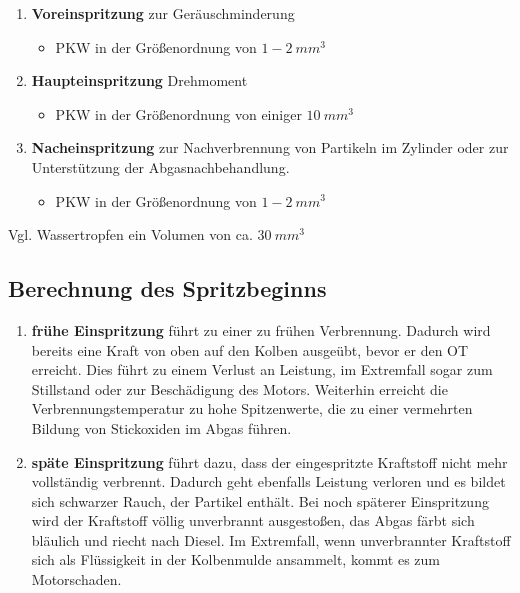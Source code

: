 \begin{enumerate}
\item
  \textbf{Voreinspritzung} zur Geräuschminderung

  \begin{itemize}
  \item
    PKW in der Größenordnung von $1 - 2~mm^3$
  \end{itemize}
\item
  \textbf{Haupteinspritzung} Drehmoment

  \begin{itemize}
  \item
    PKW in der Größenordnung von einiger $10~mm^3$
  \end{itemize}
\item
  \textbf{Nacheinspritzung} zur Nachverbrennung von Partikeln im
  Zylinder oder zur Unterstützung der Abgasnachbehandlung.

  \begin{itemize}
  \item
    PKW in der Größenordnung von $1 - 2~mm^3$
  \end{itemize}
\end{enumerate}

Vgl. Wassertropfen ein Volumen von ca. $30~mm^3$

\newpage

\subsection{Berechnung des
Spritzbeginns}\label{berechnung-des-spritzbeginns}

\begin{enumerate}
\item
  \textbf{frühe Einspritzung} führt zu einer zu frühen Verbrennung.
  Dadurch wird bereits eine Kraft von oben auf den Kolben ausgeübt,
  bevor er den OT erreicht. Dies führt zu einem Verlust an Leistung, im
  Extremfall sogar zum Stillstand oder zur Beschädigung des Motors.
  Weiterhin erreicht die Verbrennungstemperatur zu hohe Spitzenwerte,
  die zu einer vermehrten Bildung von Stickoxiden im Abgas führen.
\item
  \textbf{späte Einspritzung} führt dazu, dass der eingespritzte
  Kraftstoff nicht mehr vollständig verbrennt. Dadurch geht ebenfalls
  Leistung verloren und es bildet sich schwarzer Rauch, der Partikel
  enthält. Bei noch späterer Einspritzung wird der Kraftstoff völlig
  unverbrannt ausgestoßen, das Abgas färbt sich bläulich und riecht nach
  Diesel. Im Extremfall, wenn unverbrannter Kraftstoff sich als
  Flüssigkeit in der Kolbenmulde ansammelt, kommt es zum Motorschaden.
\end{enumerate}

